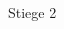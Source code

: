 \documentclass[a4paper]{article}
\begin{document}
\printGenericVSLHeader
\begin{center}
\begin{vsltext}{3cm}{3.5cm}

    \vspace{3cm}

    \Stair{2cm} Stiege 2

\end{vsltext}
\end{center}
\end{document}
